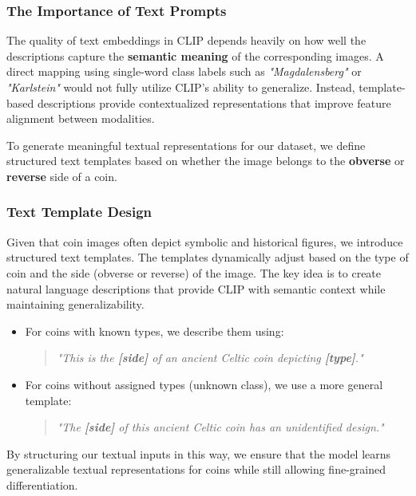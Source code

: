 \documentclass[nolibertine, english, algorithm, nomencl, minted]{ttlab-qualify}
\begin{document}
\subsubsection{The Importance of Text Prompts}

The quality of text embeddings in CLIP depends heavily on how well the descriptions capture the \textbf{semantic meaning} of 
the corresponding images. A direct mapping using single-word class labels such as \textit{"Magdalensberg"} or \textit{"Karlstein"} 
would not fully utilize CLIP’s ability to generalize. Instead, template-based descriptions provide contextualized representations 
that improve feature alignment between modalities.

To generate meaningful textual representations for our dataset, we define structured text templates based on whether the image 
belongs to the \textbf{obverse} or \textbf{reverse} side of a coin.

\subsubsection{Text Template Design}

Given that coin images often depict symbolic and historical figures, we introduce structured text templates. 
The templates dynamically adjust based on the type of coin and the side (obverse or reverse) of the image. 
The key idea is to create natural language descriptions that provide CLIP with semantic context while maintaining generalizability.

\begin{itemize}
    \item For coins with known types, we describe them using:
    \begin{quote}
        \textit{"This is the \textbf{[side]} of an ancient Celtic coin depicting \textbf{[type]}."}
    \end{quote}
    \item For coins without assigned types (unknown class), we use a more general template:
    \begin{quote}
        \textit{"The \textbf{[side]} of this ancient Celtic coin has an unidentified design."}
    \end{quote}
\end{itemize}

By structuring our textual inputs in this way, we ensure that the model learns generalizable textual representations for coins while 
still allowing fine-grained differentiation.
\end{document}
